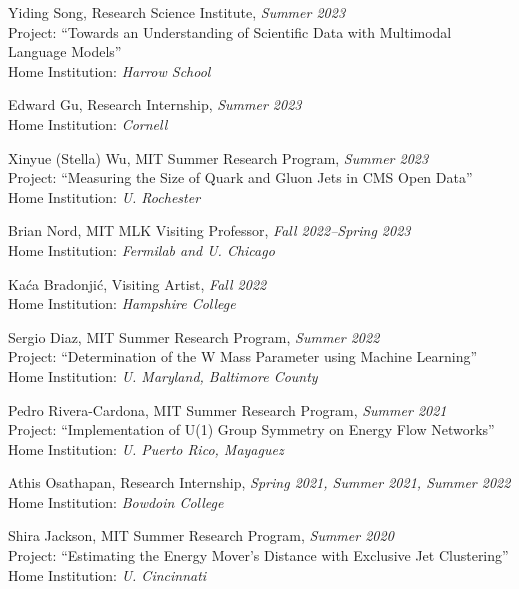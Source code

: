 \bbl

\item Yiding Song, Research Science Institute, \emph{Summer 2023}
\\ Project: ``Towards an Understanding of Scientific Data with Multimodal Language Models''
\\ Home Institution: \emph{Harrow School}

\item Edward Gu, Research Internship, \emph{Summer 2023}
\\ Home Institution: \emph{Cornell}

\item Xinyue (Stella) Wu, MIT Summer Research Program, \emph{Summer 2023}
\\ Project: ``Measuring the Size of Quark and Gluon Jets in CMS Open Data''
\\ Home Institution: \emph{U. Rochester}

\item Brian Nord, MIT MLK Visiting Professor, \emph{Fall 2022--Spring 2023}
\\ Home Institution: \emph{Fermilab and U. Chicago}

\item Kaća Bradonjić, Visiting Artist, \emph{Fall 2022}
\\ Home Institution: \emph{Hampshire College}

\item Sergio Diaz, MIT Summer Research Program, \emph{Summer 2022}
\\ Project: ``Determination of the W Mass Parameter using Machine Learning''
\\ Home Institution: \emph{U. Maryland, Baltimore County}

\item Pedro Rivera-Cardona, MIT Summer Research Program, \emph{Summer 2021}
\\ Project: ``Implementation of U(1) Group Symmetry on Energy Flow Networks''
\\ Home Institution: \emph{U. Puerto Rico, Mayaguez}

\item Athis Osathapan, Research Internship, \emph{Spring 2021, Summer 2021, Summer 2022}
\\ Home Institution: \emph{Bowdoin College}

\item Shira Jackson, MIT Summer Research Program, \emph{Summer 2020}
\\ Project: ``Estimating the Energy Mover’s Distance with Exclusive Jet Clustering''
\\ Home Institution: \emph{U. Cincinnati}

